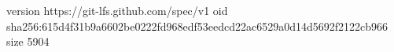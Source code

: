version https://git-lfs.github.com/spec/v1
oid sha256:615d4f31b9a6602be0222fd968edf53eedcd22ac6529a0d14d5692f2122cb966
size 5904
